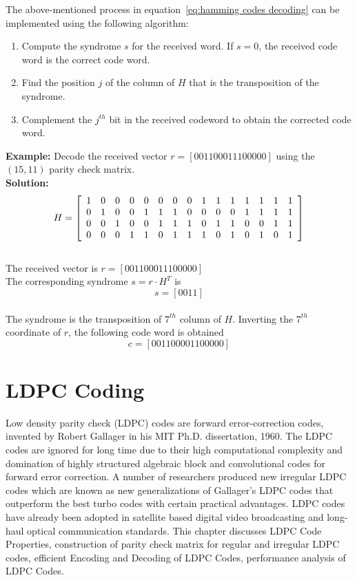 The above-mentioned process in equation~\ref{eq:hamming codes decoding} can be implemented using the following algorithm:
\begin{enumerate}
    \item Compute the syndrome $s$ for the received word. If $s = 0$, the received code word is the correct code word.
    \item Find the position $j$ of the column of $H$ that is the transposition of the syndrome.
    \item Complement the $j^{th}$ bit in the received codeword to obtain the corrected code word. \\
\end{enumerate}

\textbf{Example:} Decode the received vector $r = [001100011100000]$ using the $(15,11)$ parity check matrix. \\
\textbf{Solution:} \\
\[
H = \left[ \begin{array}{c c c c c c c c c c c c c c c}
    1&0&0&0&0&0&0&0&1&1&1&1&1&1&1 \\
    0&1&0&0&1&1&1&0&0&0&0&1&1&1&1 \\
    0&0&1&0&0&1&1&1&0&1&1&0&0&1&1 \\
    0&0&0&1&1&0&1&1&1&0&1&0&1&0&1    
\end{array} \right]
\] \\
The received vector is $r = [001100011100000]$ \\
The corresponding syndrome $s = r \cdot H^T$ is \\
\[s = [0011]\] \\
The syndrome is the transposition of $7^{th}$ column of $H$. Inverting the $7^{th}$ coordinate of $r$, the following code word is obtained \\
\[c = [001100001100000]\]


\section{LDPC Coding}
Low density parity check (LDPC) codes are forward error-correction codes, invented by Robert Gallager in his MIT Ph.D. dissertation, 1960. The LDPC codes are ignored for long time due to their high computational complexity and domination of highly structured algebraic block and convolutional codes for forward error correction. A number of researchers produced new irregular LDPC codes which are known as new generalizations of Gallager's LDPC codes that outperform the best turbo codes with certain practical advantages. LDPC codes have already been adopted in satellite based digital video broadcasting and long-haul optical communication standards. This chapter discusses LDPC Code Properties, construction of parity check matrix for regular and irregular LDPC codes, efficient Encoding and Decoding of LDPC Codes, performance analysis of LDPC Codes.

